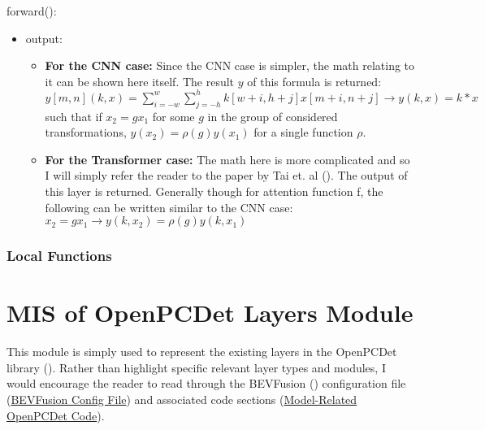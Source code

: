 \documentclass[12pt, titlepage]{article}
\begin{document}
\noindent forward():
\begin{itemize}
\item output:
\begin{itemize}
  \item \textbf{For the CNN case:} Since the CNN case is simpler, the math relating to it can be shown here itself. The result $y$ of this formula is returned:
  \newline\newline
  $y[m,n](k,x)=\sum_{i=-w}^{w}\sum_{j=-h}^{h}k[w+i,h+j]x[m+i,n+j]\rightarrow{}y(k,x)=k*x$ \newline
  such that if $x_{2}=gx_{1}$ for some $g$ in the group of considered transformations, $y(x_{2})=\rho(g)y(x_{1})$
  for a single function $\rho$.
  \newline
  \item \textbf{For the Transformer case:} The math here is more complicated and so I will simply refer the reader to the paper by Tai et. al (\cite{tai2019equivariant}). The output of this layer is returned. Generally though for attention function f,
  the following can be written similar to the CNN case:
  $x_{2}=gx_{1} \rightarrow{} y(k,x_{2})=\rho(g)y(k,x_{1})$ 
\end{itemize}
\end{itemize}

\subsubsection{Local Functions}

\newpage

\section{MIS of OpenPCDet Layers Module} \label{ModulePCDet} 
This module is simply used to represent the existing layers in the OpenPCDet library (\cite{openpcdet2020}).
Rather than highlight specific relevant layer types and modules, I would encourage the reader to read through the BEVFusion (\cite{liang2022bevfusion})
configuration file (\href{https://github.com/open-mmlab/OpenPCDet/blob/master/tools/cfgs/nuscenes_models/bevfusion.yaml}{BEVFusion Config File}) and 
associated code sections (\href{https://github.com/open-mmlab/OpenPCDet/tree/master/pcdet/models}{Model-Related OpenPCDet Code}).

\newpage
\end{document}
